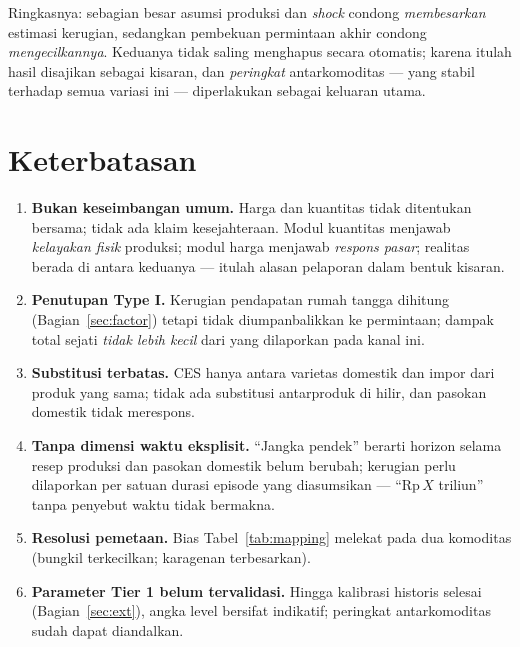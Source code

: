 \documentclass[11pt,a4paper]{article}
\newcommand{\en}[1]{\textit{#1}}   %
\begin{document}
Ringkasnya: sebagian besar asumsi produksi dan \en{shock} condong
\emph{membesarkan} estimasi kerugian, sedangkan pembekuan permintaan
akhir condong \emph{mengecilkannya}. Keduanya tidak saling menghapus
secara otomatis; karena itulah hasil disajikan sebagai kisaran, dan
\emph{peringkat} antarkomoditas --- yang stabil terhadap semua variasi
ini --- diperlakukan sebagai keluaran utama.

\section{Keterbatasan}
\label{sec:limit}

\begin{enumerate}[nosep]
\item \textbf{Bukan keseimbangan umum.} Harga dan kuantitas tidak
      ditentukan bersama; tidak ada klaim kesejahteraan. Modul kuantitas
      menjawab \emph{kelayakan fisik} produksi; modul harga menjawab
      \emph{respons pasar}; realitas berada di antara keduanya --- itulah
      alasan pelaporan dalam bentuk kisaran.
\item \textbf{Penutupan Type I.} Kerugian pendapatan rumah tangga dihitung
      (Bagian~\ref{sec:factor}) tetapi tidak diumpanbalikkan ke
      permintaan; dampak total sejati \emph{tidak lebih kecil} dari yang
      dilaporkan pada kanal ini.
\item \textbf{Substitusi terbatas.} CES hanya antara varietas domestik dan
      impor dari produk yang sama; tidak ada substitusi antarproduk di
      hilir, dan pasokan domestik tidak merespons.
\item \textbf{Tanpa dimensi waktu eksplisit.} ``Jangka pendek'' berarti
      horizon selama resep produksi dan pasokan domestik belum berubah;
      kerugian perlu dilaporkan per satuan durasi episode yang
      diasumsikan --- ``Rp\,$X$ triliun'' tanpa penyebut waktu tidak
      bermakna.
\item \textbf{Resolusi pemetaan.} Bias Tabel~\ref{tab:mapping} melekat
      pada dua komoditas (bungkil terkecilkan; karagenan terbesarkan).
\item \textbf{Parameter Tier 1 belum tervalidasi.} Hingga kalibrasi
      historis selesai (Bagian~\ref{sec:ext}), angka level bersifat
      indikatif; peringkat antarkomoditas sudah dapat diandalkan.
\end{enumerate}
\end{document}
